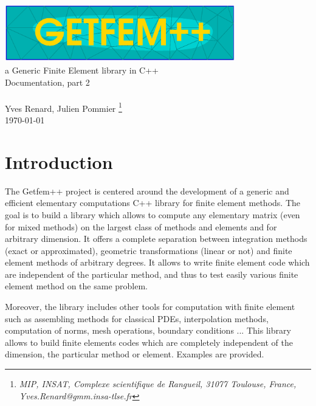 \documentclass[11pt,a4paper]{article}
\begin{document}
\begin{center}
  \includegraphics[width=10cm,angle=0]{getfemlogo.eps}\\[0.2cm]
  a Generic Finite Element library in C++ \\[0.5cm]
  {\LARGE Documentation, part \Huge 2} \\[0.5cm]
   \\[0.5cm]
  { \large Yves {\sc Renard}, Julien {\sc Pommier} \footnote{ \it MIP, INSAT, Complexe scientifique de Rangueil, 31077 Toulouse, France, Yves.Renard@gmm.insa-tlse.fr } } \\[1.0cm]
  \today \\[1.0cm]
\end{center}




\section*{Introduction}


The {\sc Getfem++} project is centered around the development of a generic and efficient elementary computations C++ library for finite element methods. The goal is to build a library which allows to compute any elementary matrix (even for mixed methods) on the largest class of methods and elements and for arbitrary dimension. It offers a complete separation between integration methods (exact or approximated), geometric transformations (linear or not) and finite element methods of arbitrary degrees. It allows to write finite element code which are independent of the particular method, and thus to test easily various finite element method on the same problem.

 Moreover, the library includes other tools for computation with finite element such as assembling methods for classical PDEs, interpolation methods, computation of norms, mesh operations, boundary conditions ... This library allows to build finite elements codes which are completely independent of the dimension, the particular method or element. Examples are provided.\\[2cm]

\end{document}
